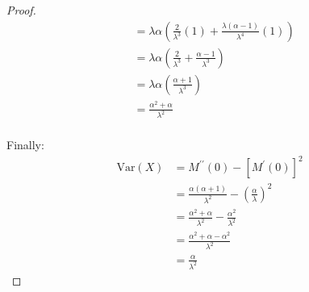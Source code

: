 \documentclass[12pt]{article}
\begin{document}
\begin{proof}
\begin{equation}
\begin{split}
								&=	\lambda\alpha\left(\frac{2}{\lambda^3}(1) + \frac{\lambda(\alpha-1)}{\lambda^4}(1)\right)\\
								&=	\lambda\alpha\left(\frac{2}{\lambda^3} + \frac{\alpha-1}{\lambda^3}\right)\\
								&=	\lambda\alpha\left(\frac{\alpha+1}{\lambda^3}\right)\\
								&=	\frac{\alpha^2 + \alpha}{\lambda^2}
		\end{split}
	\end{equation}\\[-30pt]
	Finally:\vspace*{-12pt}
	\begin{equation}
		\begin{split}
			\text{Var}(X)	&=	 M^{\prime\prime}(0) - [M^\prime(0)]^2\\
							&=	\frac{\alpha(\alpha+1)}{\lambda^2} - \left(\frac{\alpha}{\lambda}\right)^2\\
							&=	\frac{\alpha^2+\alpha}{\lambda^2} - \frac{\alpha^2}{\lambda^2}\\
							&=	\frac{\alpha^2 + \alpha -\alpha^2}{\lambda^2}\\
							&=	\frac{\alpha}{\lambda^2}
		\end{split}
	\end{equation}
\end{proof}
\end{document}
